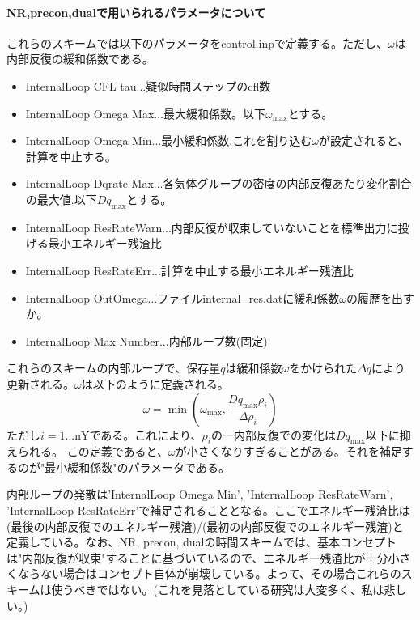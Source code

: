\documentclass{jsarticle}
\begin{document}
\paragraph{NR,precon,dualで用いられるパラメータについて}%
これらのスキームでは以下のパラメータをcontrol.inpで定義する。ただし、$\omega$は内部反復の緩和係数である。
\begin{itemize}
\item InternalLoop CFL tau...疑似時間ステップのcfl数
\item InternalLoop Omega Max...最大緩和係数。以下$\omega_{\max}$とする。
\item InternalLoop Omega Min...最小緩和係数.これを割り込む$\omega$が設定されると、計算を中止する。
\item InternalLoop Dqrate Max...各気体グループの密度の内部反復あたり変化割合の最大値.以下$Dq_{\max}$とする。
\item InternalLoop ResRateWarn...内部反復が収束していないことを標準出力に投げる最小エネルギー残渣比
\item InternalLoop ResRateErr...計算を中止する最小エネルギー残渣比
\item InternalLoop OutOmega...ファイルinternal\_res.datに緩和係数$\omega$の履歴を出すか。
\item InternalLoop Max Number...内部ループ数(固定)
\end{itemize}
これらのスキームの内部ループで、保存量$q$は緩和係数$\omega$をかけられた$\Delta q$により更新される。$\omega$は以下のように定義される。
\begin{equation}
\omega = \min(\omega_{\max} ,\frac{Dq_{\max}\rho_i}{\Delta \rho_i})
\end{equation}
ただし$i=1...$nYである。これにより、$\rho_i$の一内部反復での変化は$Dq_{\max}$以下に抑えられる。
この定義であると、$\omega$が小さくなりすぎることがある。それを補足するのが"最小緩和係数"のパラメータである。

内部ループの発散は'InternalLoop Omega Min', 'InternalLoop ResRateWarn', 'InternalLoop ResRateErr'で補足されることとなる。ここでエネルギー残渣比は(最後の内部反復でのエネルギー残渣)/(最初の内部反復でのエネルギー残渣)と定義している。なお、NR, precon, dualの時間スキームでは、基本コンセプトは"内部反復が収束"することに基づいているので、エネルギー残渣比が十分小さくならない場合はコンセプト自体が崩壊している。よって、その場合これらのスキームは使うべきではない。(これを見落としている研究は大変多く、私は悲しい。)
\end{document}
